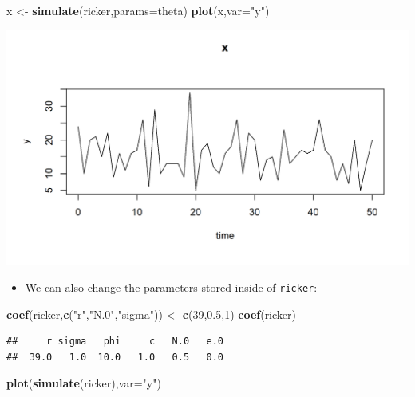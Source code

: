 \documentclass[]{article}
\newenvironment{Shaded}{\begin{snugshade}}{\end{snugshade}}
\newcommand{\KeywordTok}[1]{\textcolor[rgb]{0.13,0.29,0.53}{\textbf{#1}}}
\newcommand{\DataTypeTok}[1]{\textcolor[rgb]{0.13,0.29,0.53}{#1}}
\newcommand{\DecValTok}[1]{\textcolor[rgb]{0.00,0.00,0.81}{#1}}
\newcommand{\FloatTok}[1]{\textcolor[rgb]{0.00,0.00,0.81}{#1}}
\newcommand{\StringTok}[1]{\textcolor[rgb]{0.31,0.60,0.02}{#1}}
\newcommand{\NormalTok}[1]{#1}
\providecommand{\tightlist}{%
  \setlength{\itemsep}{0pt}\setlength{\parskip}{0pt}}
\begin{document}
\begin{Shaded}
\begin{Highlighting}[]
\NormalTok{x <-}\StringTok{ }\KeywordTok{simulate}\NormalTok{(ricker,}\DataTypeTok{params=}\NormalTok{theta)}
\KeywordTok{plot}\NormalTok{(x,}\DataTypeTok{var=}\StringTok{"y"}\NormalTok{)}
\end{Highlighting}
\end{Shaded}

\begin{center}\includegraphics{figure/intro-unnamed-chunk-5-2} \end{center}

\begin{itemize}
\tightlist
\item
  We can also change the parameters stored inside of \texttt{ricker}:
\end{itemize}

\begin{Shaded}
\begin{Highlighting}[]
\KeywordTok{coef}\NormalTok{(ricker,}\KeywordTok{c}\NormalTok{(}\StringTok{"r"}\NormalTok{,}\StringTok{"N.0"}\NormalTok{,}\StringTok{"sigma"}\NormalTok{)) <-}\StringTok{ }\KeywordTok{c}\NormalTok{(}\DecValTok{39}\NormalTok{,}\FloatTok{0.5}\NormalTok{,}\DecValTok{1}\NormalTok{)}
\KeywordTok{coef}\NormalTok{(ricker)}
\end{Highlighting}
\end{Shaded}

\begin{verbatim}
##     r sigma   phi     c   N.0   e.0 
##  39.0   1.0  10.0   1.0   0.5   0.0
\end{verbatim}

\begin{Shaded}
\begin{Highlighting}[]
\KeywordTok{plot}\NormalTok{(}\KeywordTok{simulate}\NormalTok{(ricker),}\DataTypeTok{var=}\StringTok{"y"}\NormalTok{)}
\end{Highlighting}
\end{Shaded}
\end{document}
